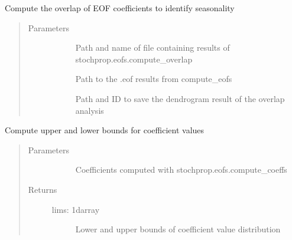 \documentclass[letterpaper,10pt,english]{sphinxmanual}
\begin{document}
\begin{fulllineitems}
\label{\detokenize{stochprop.eofs:stochprop.eofs.compute_seasonality}}
Compute the overlap of EOF coefficients to identify seasonality
\begin{quote}\begin{description}
\item[{Parameters}] \leavevmode\begin{description}
\item[{}] \leavevmode
Path and name of file containing results of stochprop.eofs.compute\_overlap

\item[{}] \leavevmode
Path to the .eof results from compute\_eofs

\item[{}] \leavevmode
Path and ID to save the dendrogram result of the overlap analysis

\end{description}

\end{description}\end{quote}

\end{fulllineitems}


\begin{fulllineitems}
\label{\detokenize{stochprop.eofs:stochprop.eofs.define_coeff_limits}}
Compute upper and lower bounds for coefficient values
\begin{quote}\begin{description}
\item[{Parameters}] \leavevmode\begin{description}
\item[{}] \leavevmode
Coefficients computed with stochprop.eofs.compute\_coeffs

\end{description}

\item[{Returns}] \leavevmode\begin{description}
\item[{lims: 1darray}] \leavevmode
Lower and upper bounds of coefficient value distribution

\end{description}

\end{description}\end{quote}

\end{fulllineitems}
\end{document}
